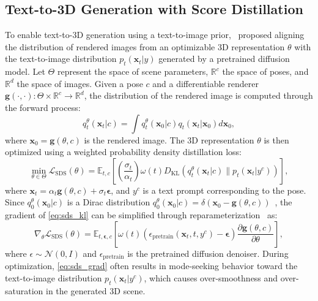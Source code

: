 \subsection{Text-to-3D Generation with Score Distillation}
To enable text-to-3D generation using a text-to-image prior,~\citet{poole2022dreamfusion} proposed aligning the distribution of rendered images from an optimizable 3D representation $\theta$ with the text-to-image distribution $p_t(\boldsymbol{x}_t|y)$ generated by a pretrained diffusion model. Let $\Theta$ represent the space of scene parameters, $\mathbb{R}^c$ the space of poses, and $\mathbb{R}^d$ the space of images. Given a pose $c$ and a differentiable renderer $\boldsymbol{g}(\cdot, \cdot): \Theta \times \mathbb{R}^c \rightarrow \mathbb{R}^d$, the distribution of the rendered image is computed through the forward process:
\begin{equation}
q^\theta_t(\boldsymbol{x}_t|c) = \int q^\theta_t(\boldsymbol{x}_0|c) q_t(\boldsymbol{x}_t|\boldsymbol{x}_0) d\boldsymbol{x}_0,
\end{equation}
where $\boldsymbol{x}_0 = \boldsymbol{g}(\theta, c)$ is the rendered image. The 3D representation $\theta$ is then optimized using a weighted probability density distillation loss:
\begin{equation}\label{eq:sds_kl}
    \min_{\theta \in \Theta} \mathcal{L}_{\mathrm{SDS}}(\theta) = \mathbb{E}_{t, c} \left[ \left( \frac{\sigma_t}{\alpha_t} \right) \omega(t) D_{\mathrm{KL}}(q_t^\theta(\boldsymbol{x}_t|c) \parallel p_t(\boldsymbol{x}_t|y^c)) \right],
\end{equation}
where $\boldsymbol{x}_t = \alpha_t \boldsymbol{g}(\theta, c) + \sigma_t \boldsymbol{\epsilon}$, and $y^c$ is a text prompt corresponding to the pose. Since $q^\theta_0(\boldsymbol{x}_0|c)$ is a Dirac distribution $q^\theta_0(\boldsymbol{x}_0|c) = \delta(\boldsymbol{x}_0 - \boldsymbol{g}(\theta, c))$~\citep{wang2024taming}, the gradient of \eqref{eq:sds_kl} can be simplified through reparameterization~\citep{ho2020denoising} as:
\begin{equation}\label{eq:sds_grad}
    \nabla_\theta \mathcal{L}_{\mathrm{SDS}}(\theta) = \mathbb{E}_{t, \boldsymbol{\epsilon}, c} \left[ \omega(t) \left( \epsilon_{\text{pretrain}}(\boldsymbol{x}_t, t, y^c) - \boldsymbol{\epsilon} \right) \frac{\partial \boldsymbol{g}(\theta, c)}{\partial \theta} \right],
\end{equation}
where $\epsilon \sim \mathcal{N}(0, I)$ and $\epsilon_{\text{pretrain}}$ is the pretrained diffusion denoiser. During optimization, \eqref{eq:sds_grad} often results in mode-seeking behavior toward the text-to-image distribution $p_t(\boldsymbol{x}_t|y^c)$, which causes over-smoothness and over-saturation in the generated 3D scene.

